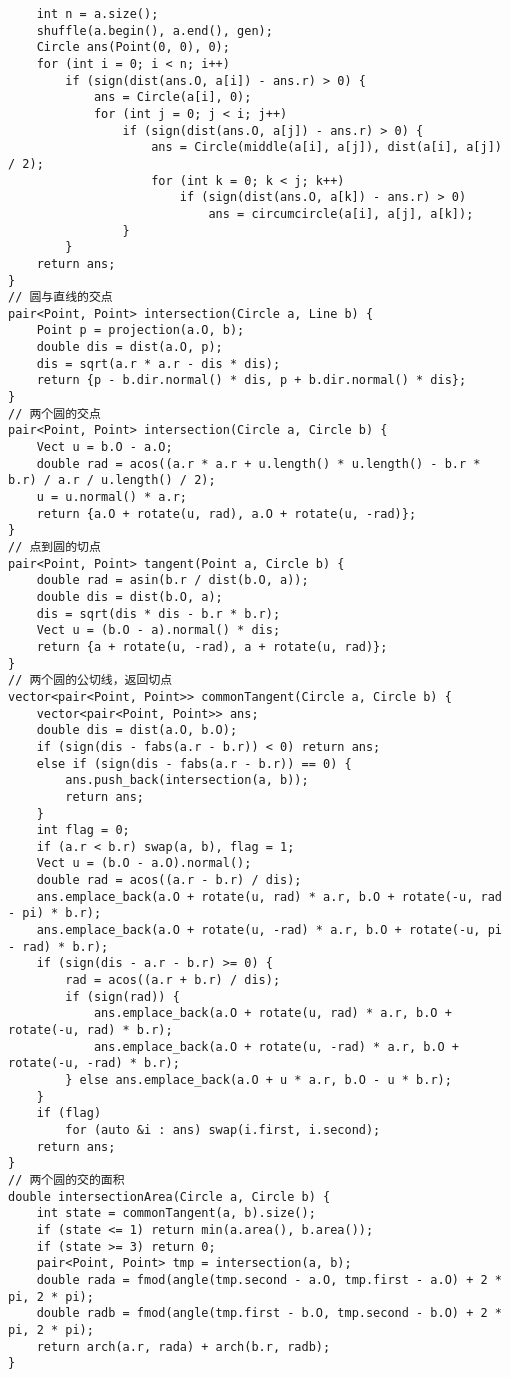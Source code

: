\begin{verbatim}
    int n = a.size();
    shuffle(a.begin(), a.end(), gen);
    Circle ans(Point(0, 0), 0);
    for (int i = 0; i < n; i++)
        if (sign(dist(ans.O, a[i]) - ans.r) > 0) {
            ans = Circle(a[i], 0);
            for (int j = 0; j < i; j++)
                if (sign(dist(ans.O, a[j]) - ans.r) > 0) {
                    ans = Circle(middle(a[i], a[j]), dist(a[i], a[j]) / 2);
                    for (int k = 0; k < j; k++)
                        if (sign(dist(ans.O, a[k]) - ans.r) > 0)
                            ans = circumcircle(a[i], a[j], a[k]);
                }
        }
    return ans;
}
// 圆与直线的交点
pair<Point, Point> intersection(Circle a, Line b) {
    Point p = projection(a.O, b);
    double dis = dist(a.O, p);
    dis = sqrt(a.r * a.r - dis * dis);
    return {p - b.dir.normal() * dis, p + b.dir.normal() * dis};
}
// 两个圆的交点
pair<Point, Point> intersection(Circle a, Circle b) {
    Vect u = b.O - a.O;
    double rad = acos((a.r * a.r + u.length() * u.length() - b.r * b.r) / a.r / u.length() / 2);
    u = u.normal() * a.r;
    return {a.O + rotate(u, rad), a.O + rotate(u, -rad)};
}
// 点到圆的切点
pair<Point, Point> tangent(Point a, Circle b) {
    double rad = asin(b.r / dist(b.O, a));
    double dis = dist(b.O, a);
    dis = sqrt(dis * dis - b.r * b.r);
    Vect u = (b.O - a).normal() * dis;
    return {a + rotate(u, -rad), a + rotate(u, rad)};
}
// 两个圆的公切线，返回切点
vector<pair<Point, Point>> commonTangent(Circle a, Circle b) {
    vector<pair<Point, Point>> ans;
    double dis = dist(a.O, b.O);
    if (sign(dis - fabs(a.r - b.r)) < 0) return ans;
    else if (sign(dis - fabs(a.r - b.r)) == 0) {
        ans.push_back(intersection(a, b));
        return ans;
    }
    int flag = 0;
    if (a.r < b.r) swap(a, b), flag = 1;
    Vect u = (b.O - a.O).normal();
    double rad = acos((a.r - b.r) / dis);
    ans.emplace_back(a.O + rotate(u, rad) * a.r, b.O + rotate(-u, rad - pi) * b.r);
    ans.emplace_back(a.O + rotate(u, -rad) * a.r, b.O + rotate(-u, pi - rad) * b.r);
    if (sign(dis - a.r - b.r) >= 0) {
        rad = acos((a.r + b.r) / dis);
        if (sign(rad)) {
            ans.emplace_back(a.O + rotate(u, rad) * a.r, b.O + rotate(-u, rad) * b.r);
            ans.emplace_back(a.O + rotate(u, -rad) * a.r, b.O + rotate(-u, -rad) * b.r);
        } else ans.emplace_back(a.O + u * a.r, b.O - u * b.r);
    }
    if (flag)
        for (auto &i : ans) swap(i.first, i.second);
    return ans;
}
// 两个圆的交的面积
double intersectionArea(Circle a, Circle b) {
    int state = commonTangent(a, b).size();
    if (state <= 1) return min(a.area(), b.area());
    if (state >= 3) return 0;
    pair<Point, Point> tmp = intersection(a, b);
    double rada = fmod(angle(tmp.second - a.O, tmp.first - a.O) + 2 * pi, 2 * pi);
    double radb = fmod(angle(tmp.first - b.O, tmp.second - b.O) + 2 * pi, 2 * pi);
    return arch(a.r, rada) + arch(b.r, radb);
}
\end{verbatim}